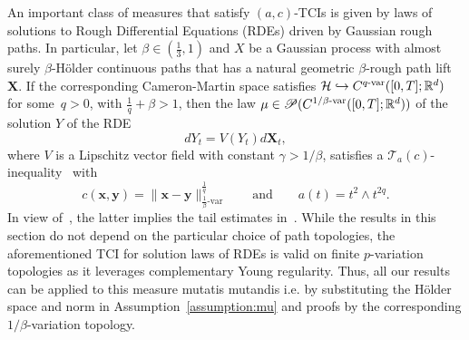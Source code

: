 \documentclass[twoside,11pt]{article}
\numberwithin{equation}{section}
\numberwithin{theorem}{section}
\newcommand{\R}{\mathbb{R}}
\newcommand{\h}{\mathcal{H}}
\begin{document}
\begin{example}\label{example:RDEs}
An important class of measures that satisfy $(a, c)$-TCIs is given by laws of solutions to Rough Differential Equations (RDEs) driven by Gaussian rough paths. In particular, let $\beta\in(\tfrac{1}{3}, 1)$ and $X$ be a Gaussian process with almost surely $\beta$-H\"older continuous paths that has a natural geometric $\beta$-rough path lift~$\mathbf{X}.$
If the corresponding Cameron-Martin space satisfies 
$\h\hookrightarrow C^{q\textnormal{-var}}([0,T];\R^d)$
for some~$q>0$, with $\frac{1}{q}+\beta>1$, then the law $\mu\in\mathscr{P}(C^{1/\beta\textnormal{-var}}([0,T];\R^d))$ of the solution $Y$ of the RDE 
$$
dY_t=V(Y_t)d\mathbf{X}_t,
$$
where $V$ is a Lipschitz vector field with constant $\gamma>1/\beta$, satisfies a $\mathcal{T}_a(c)$-inequality~\cite[Theorem~3.3]{gasteratos2023transportation} with
$$
c(\mathbf{x},\mathbf{y})=\|\mathbf{x}-\mathbf{y}\|_{\frac{1}{\beta}\text{-var}}^{\frac{1}{q}}
\qquad\text{and}\qquad
a(t)=t^2\wedge t^{2q}.
$$
In view of~\cite[Corollary 3.5]{gasteratos2023transportation}, the latter implies the tail estimates in~\citep{cass2013integrability}. While the results in this section do not depend on the particular choice of path topologies, the aforementioned TCI for solution laws of RDEs is valid on finite $p$-variation topologies as it leverages complementary Young regularity. Thus, all our results can be applied to this measure mutatis mutandis i.e. by substituting the H\"older space and norm in Assumption~\ref{assumption:mu} and proofs by the corresponding $1/\beta$-variation topology. 
\end{example}
\end{document}
